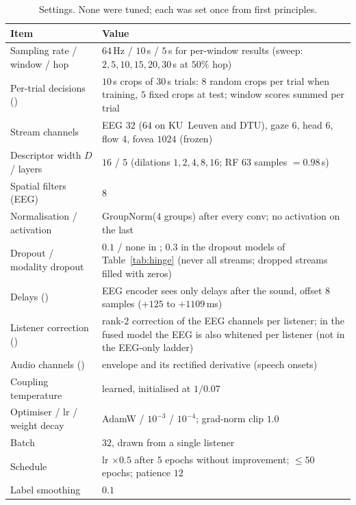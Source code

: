 \begin{table}[h]
\centering\small
\caption{Settings. None were tuned; each was set once from first principles.}
\begin{tabular}{@{}ll@{}}
\toprule
Item & Value \\
\midrule
Sampling rate / window / hop            & $64$\,Hz / $10$\,s / $5$\,s for per-window results (sweep: $2,5,10,15,20,30$\,s at $50\%$ hop) \\
Per-trial decisions (\merit{})          & $10$\,s crops of $30$\,s trials: $8$ random crops per trial when training, $5$ fixed crops at test; window scores summed per trial \\
Stream channels                         & EEG $32$ ($64$ on KU~Leuven and DTU), gaze $6$, head $6$, flow $4$, fovea $1024$ (frozen) \\
Descriptor width $D$ / layers           & $16$ / $5$ (dilations $1,2,4,8,16$; RF $63$ samples $=0.98$\,s)\\
Spatial filters (EEG)                   & $8$\\
Normalisation / activation              & GroupNorm($4$ groups) after every conv; no activation on the last\\
Dropout / modality dropout              & $0.1$ / none in \merit{}; $0.3$ in the dropout models of Table~\ref{tab:hinge} (never all streams; dropped streams filled with zeros) \\
Delays (\merit{})                       & EEG encoder sees only delays after the sound, offset $8$ samples ($+125$ to $+1109$\,ms) \\
Listener correction (\merit{})          & rank-$2$ correction of the EEG channels per listener; in the fused model the EEG is also whitened per listener (not in the EEG-only ladder) \\
Audio channels (\merit{})               & envelope and its rectified derivative (speech onsets) \\
Coupling temperature                    & learned, initialised at $1/0.07$\\
Optimiser / lr / weight decay           & AdamW / $10^{-3}$ / $10^{-4}$; grad-norm clip $1.0$\\
Batch                                   & $32$, drawn from a single listener\\
Schedule                                & lr $\times0.5$ after $5$ epochs without improvement; $\le50$ epochs; patience $12$\\
Label smoothing                         & $0.1$\\

\end{tabular}
\end{table}
